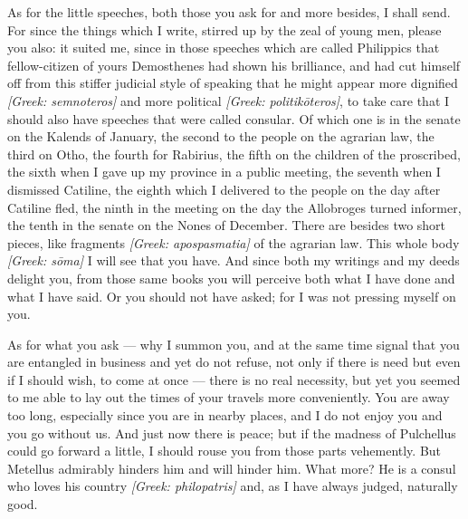  As for the little speeches, both those you ask for and more besides, I shall send. For since the things which I write, stirred up by the zeal of young men, please you also: it suited me, since in those speeches which are called Philippics that fellow-citizen of yours Demosthenes had shown his brilliance, and had cut himself off from this stiffer judicial style of speaking that he might appear more dignified \textit{[Greek: semnoteros]} and more political \textit{[Greek: politik\=oteros]}, to take care that I should also have speeches that were called consular. Of which one is in the senate on the Kalends of January, the second to the people on the agrarian law, the third on Otho, the fourth for Rabirius, the fifth on the children of the proscribed, the sixth when I gave up my province in a public meeting, the seventh when I dismissed Catiline, the eighth which I delivered to the people on the day after Catiline fled, the ninth in the meeting on the day the Allobroges turned informer, the tenth in the senate on the Nones of December. There are besides two short pieces, like fragments \textit{[Greek: apospasmatia]} of the agrarian law. This whole body \textit{[Greek: s\=oma]} I will see that you have. And since both my writings and my deeds delight you, from those same books you will perceive both what I have done and what I have said. Or you should not have asked; for I was not pressing myself on you.

 As for what you ask --- why I summon you, and at the same time signal that you are entangled in business and yet do not refuse, not only if there is need but even if I should wish, to come at once --- there is no real necessity, but yet you seemed to me able to lay out the times of your travels more conveniently. You are away too long, especially since you are in nearby places, and I do not enjoy you and you go without us. And just now there is peace; but if the madness of Pulchellus could go forward a little, I should rouse you from those parts vehemently. But Metellus admirably hinders him and will hinder him. What more? He is a consul who loves his country \textit{[Greek: philopatris]} and, as I have always judged, naturally good.


